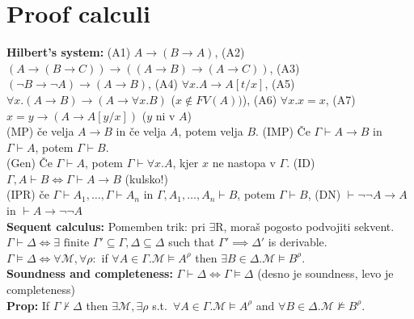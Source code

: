 \documentclass[a4paper,oneside,12pt]{article}
\theoremstyle{definition}
\newcommand{\M}{\ensuremath{\mathcal{M}}}
\begin{document}
\section*{Proof calculi}
\textbf{Hilbert's system: }(A1) $A \to (B \to A)$, (A2) $(A \to (B \to C)) \to ((A \to B) \to (A \to C))$, (A3) $(\neg B \to \neg A) \to (A \to B)$, (A4) $\forall x. A \to A[t/x]$, (A5) $\forall x. (A \to B) \to (A \to \forall x. B)$ ($x \notin FV(A))$), (A6) $\forall x. x = x$, (A7) $x = y \to (A \to A[y/x])$ ($y$ ni v $A$)\\
(MP) če velja $A \to B$ in če velja $A$, potem velja $B$. (IMP) Če $\Gamma \vdash A \to B$ in $\Gamma \vdash A$, potem $\Gamma \vdash B$. \\
(Gen) Če $\Gamma \vdash A$, potem $\Gamma \vdash \forall x. A$, kjer $x$ ne nastopa v $\Gamma$. (ID) $\Gamma , A \vdash B \iff \Gamma \vdash A \to B$ (kulsko!)\\
(IPR) če $\Gamma \vdash A_1, \ldots, \Gamma \vdash A_n$ in $\Gamma, A_1, \ldots, A_n \vdash B$, potem $\Gamma \vdash B$, (DN) $\vdash \neg \neg A \to A$ in $\vdash A \to \neg \neg A$\\
\textbf{Sequent calculus: } Pomemben trik: pri $\exists$R, moraš pogosto podvojiti sekvent.\\ %
$\Gamma \vdash \Delta \iff \exists \text{ finite } \Gamma' \subseteq \Gamma, \Delta \subseteq \Delta$ such that $\Gamma' \implies \Delta'$ is derivable.\\
$\Gamma \vDash \Delta \iff \forall \M, \forall \rho: $ if $\forall A \in \Gamma. \M \vDash A^{\rho}$ then $\exists B \in \Delta. \M \vDash B^{\rho}.$\\
\textbf{Soundness and completeness: }$\Gamma \vdash \Delta \iff \Gamma \vDash \Delta$ (desno je soundness, levo je completeness)\\
\textbf{Prop: }If $\Gamma \nvdash \Delta$ then $\exists \M, \exists \rho$ s.t.\ $\forall A \in \Gamma. \M \vDash A^{\rho}$ and $\forall B \in \Delta. \M \nvDash B^{\rho}$.
\end{document}
